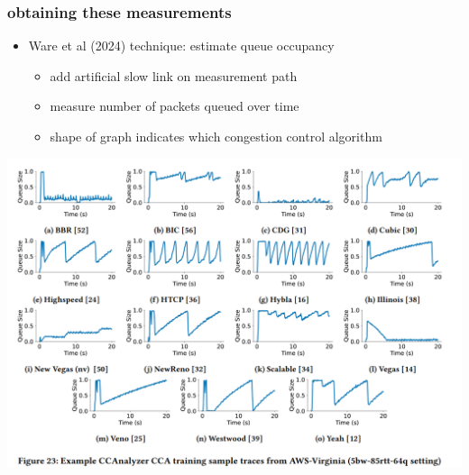 \begin{frame}
\frametitle{obtaining these measurements}
\begin{itemize}
\item Ware et al (2024) technique: estimate queue occupancy
    \begin{itemize}
    \item add artificial slow link on measurement path
    \item measure number of packets queued over time
    \item shape of graph indicates which congestion control algorithm
    \end{itemize}
\end{itemize}
    \includegraphics[height=0.5\textheight]{../congest/ware-et-al-fig23}
\end{frame}
